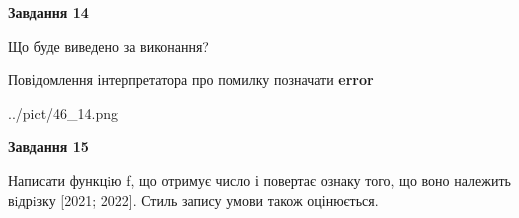 \documentclass[11pt, ukrainian]{article}
\begin{document}
{\begin {large}
{\begin {center}\textbf{Завдання 14}\end {center}}\par
Що буде виведено за виконання? \par
Повідомлення інтерпретатора про помилку позначати \textbf{error}

\begin{center}
	{../pict/46_14.png}
\end{center}
\newpage

{\begin {center}\textbf{Завдання 15}\end {center}}\par

Написати функцiю f, що отримує число і повертає ознаку того, що воно належить вiдрiзку [2021; 2022]. Стиль запису умови також оцінюється.\par
\newpage

\end {large}}
\end{document}
